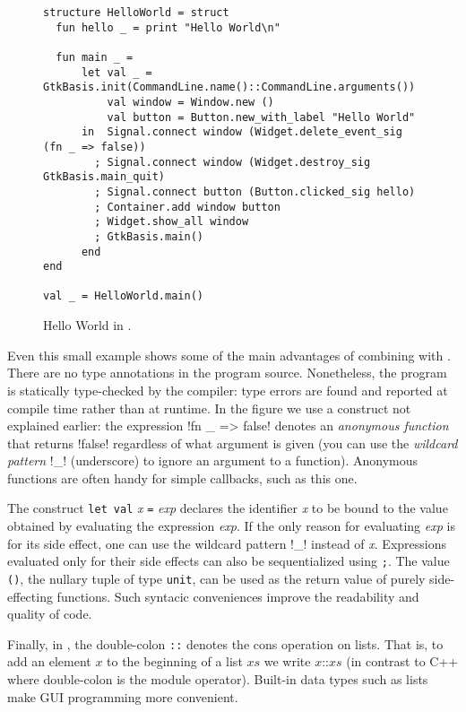 \documentclass[finalversion]{usetex-v1}
\begin{document}
\begin{figure*}[htp]
\begin{centering}
\begin{verbatim}
structure HelloWorld = struct
  fun hello _ = print "Hello World\n"

  fun main _ =
      let val _ = GtkBasis.init(CommandLine.name()::CommandLine.arguments())
          val window = Window.new ()
          val button = Button.new_with_label "Hello World"
      in  Signal.connect window (Widget.delete_event_sig (fn _ => false))
        ; Signal.connect window (Widget.destroy_sig GtkBasis.main_quit)
        ; Signal.connect button (Button.clicked_sig hello)
        ; Container.add window button
        ; Widget.show_all window
        ; GtkBasis.main() 
      end
end

val _ = HelloWorld.main()
\end{verbatim}
\caption{Hello World in \mgtk.\label{fig:hello-world}}
\end{centering}
\end{figure*}

Even this small example shows some of the main advantages of
combining \sml with \gtk.  There are no type annotations
in the program source. Nonetheless, the program is statically type-checked by
the compiler: type errors are found and reported at compile time
rather than at runtime.  In the figure we use a \sml construct
not explained earlier: the expression !fn _ => false!  denotes an
\emph{anonymous function} that returns !false! regardless of what
argument is given (you can use the \emph{wildcard pattern} !_!
(underscore) to ignore an argument to a function).
Anonymous functions are often handy for simple
callbacks, such as this one.

The construct \texttt{let}~\texttt{val}
\textit{x} \texttt{=} \textit{exp} declares the identifier \textit{x}
to be bound to the value obtained by evaluating the expression
\textit{exp}.  If the only reason for evaluating \textit{exp} is for
its side effect, one can use the wildcard pattern !_! instead of \textit{x}.
Expressions evaluated only for their side effects can also be
sequentialized using \texttt{;}.  The value \texttt{()}, the nullary
tuple of type \texttt{unit}, can be used as the return value of purely
side-effecting functions.
Such syntacic conveniences improve the readability and
quality of code.

Finally, in \sml, the double-colon \texttt{::}
denotes the cons operation on lists.  That is, to add an element $x$
to the beginning of a list $\mathit{xs}$ we write $x \texttt{::}
\mathit{xs}$ (in contrast to C++ where double-colon is the module operator).  
Built-in data types such as lists make GUI programming more convenient.
\end{document}
